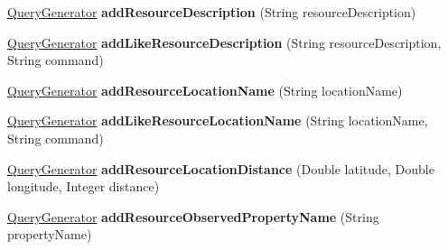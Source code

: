 \begin{DoxyCompactItemize}
\item 
\hyperlink{classeu_1_1h2020_1_1symbiote_1_1query_1_1QueryGenerator}{Query\+Generator} {\bfseries add\+Resource\+Description} (String resource\+Description)\hypertarget{classeu_1_1h2020_1_1symbiote_1_1query_1_1QueryGenerator_a811289fd4a4ca55e407c56ba94da42a9}{}\label{classeu_1_1h2020_1_1symbiote_1_1query_1_1QueryGenerator_a811289fd4a4ca55e407c56ba94da42a9}

\item 
\hyperlink{classeu_1_1h2020_1_1symbiote_1_1query_1_1QueryGenerator}{Query\+Generator} {\bfseries add\+Like\+Resource\+Description} (String resource\+Description, String command)\hypertarget{classeu_1_1h2020_1_1symbiote_1_1query_1_1QueryGenerator_afa8ef3cc65ffbfdf2fd1dc948634ed52}{}\label{classeu_1_1h2020_1_1symbiote_1_1query_1_1QueryGenerator_afa8ef3cc65ffbfdf2fd1dc948634ed52}

\item 
\hyperlink{classeu_1_1h2020_1_1symbiote_1_1query_1_1QueryGenerator}{Query\+Generator} {\bfseries add\+Resource\+Location\+Name} (String location\+Name)\hypertarget{classeu_1_1h2020_1_1symbiote_1_1query_1_1QueryGenerator_a1a2e936bbedefbca381953afd0467e4e}{}\label{classeu_1_1h2020_1_1symbiote_1_1query_1_1QueryGenerator_a1a2e936bbedefbca381953afd0467e4e}

\item 
\hyperlink{classeu_1_1h2020_1_1symbiote_1_1query_1_1QueryGenerator}{Query\+Generator} {\bfseries add\+Like\+Resource\+Location\+Name} (String location\+Name, String command)\hypertarget{classeu_1_1h2020_1_1symbiote_1_1query_1_1QueryGenerator_a0b182a5fe22d5c409a26d99a3be90eba}{}\label{classeu_1_1h2020_1_1symbiote_1_1query_1_1QueryGenerator_a0b182a5fe22d5c409a26d99a3be90eba}

\item 
\hyperlink{classeu_1_1h2020_1_1symbiote_1_1query_1_1QueryGenerator}{Query\+Generator} {\bfseries add\+Resource\+Location\+Distance} (Double latitude, Double longitude, Integer distance)\hypertarget{classeu_1_1h2020_1_1symbiote_1_1query_1_1QueryGenerator_a49f34146c17f6e550acdebf86930b3ec}{}\label{classeu_1_1h2020_1_1symbiote_1_1query_1_1QueryGenerator_a49f34146c17f6e550acdebf86930b3ec}

\item 
\hyperlink{classeu_1_1h2020_1_1symbiote_1_1query_1_1QueryGenerator}{Query\+Generator} {\bfseries add\+Resource\+Observed\+Property\+Name} (String property\+Name)\hypertarget{classeu_1_1h2020_1_1symbiote_1_1query_1_1QueryGenerator_ad7c012c8f3eafc59dcfa8fe56e5aff34}{}\label{classeu_1_1h2020_1_1symbiote_1_1query_1_1QueryGenerator_ad7c012c8f3eafc59dcfa8fe56e5aff34}


\end{DoxyCompactItemize}
